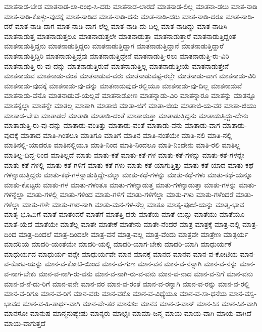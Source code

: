 {ಮಾತನಾಡ-ಬೇಡ
ಮಾತನಾಡ-ಲಾ-ರಂಭಿ-ಸಿ-ದರು
ಮಾತನಾಡ-ಲಾರದೆ
ಮಾತನಾಡ-ಲಿಲ್ಲ
ಮಾತನಾ-ಡಲು
ಮಾತ-ನಾಡಿ
ಮಾತ-ನಾಡಿ-ಕೊಳ್ಳು-ವುದಕ್ಕೆ
ಮಾತ-ನಾಡಿದ
ಮಾತ-ನಾಡಿ-ದನು
ಮಾತ-ನಾಡಿ-ದರು
ಮಾತ-ನಾಡಿ-ದರೂ
ಮಾತ-ನಾಡಿ-ದರೆ
ಮಾತ-ನಾಡಿ-ದಾಗ
ಮಾತ-ನಾಡಿ-ದಾಗ-ಲೆಲ್ಲ
ಮಾತ-ನಾಡಿ-ದು-ದಿಲ್ಲ
ಮಾತ-ನಾಡಿದ್ದು
ಮಾತ-ನಾಡಿಸಿ
ಮಾತನಾಡುತ್ತ
ಮಾತನಾಡುತ್ತಲೂ
ಮಾತನಾಡುತ್ತಲೇ
ಮಾತನಾಡುತ್ತಾ
ಮಾತನಾಡುತ್ತಾರೆ
ಮಾತನಾಡುತ್ತಿದ್ದಂತೆ
ಮಾತನಾಡುತ್ತಿದ್ದನು
ಮಾತನಾಡುತ್ತಿದ್ದರು
ಮಾತನಾಡುತ್ತಿದ್ದಾಗ
ಮಾತನಾಡುತ್ತಿದ್ದಾನೆ
ಮಾತನಾಡುತ್ತಿದ್ದಾರೆ
ಮಾತನಾಡುತ್ತಿದ್ದಿರಿ
ಮಾತನಾಡುತ್ತಿದ್ದೆವು
ಮಾತನಾಡುತ್ತಿದ್ದೇನೆ
ಮಾತನಾಡುತ್ತಿ-ರಲು
ಮಾತನಾಡುತ್ತಿ-ರು-ವಿರಿ
ಮಾತನಾಡುತ್ತಿ-ರು-ವು-ದನ್ನು
ಮಾತನಾಡುತ್ತಿರುವೆ
ಮಾತನಾಡುತ್ತಿಲ್ಲ
ಮಾತನಾಡುತ್ತೀಯೆ
ಮಾತನಾಡುತ್ತೇನೆ
ಮಾತನಾಡುವ
ಮಾತನಾಡು-ವಂತೆ
ಮಾತನಾಡುವ-ವರು
ಮಾತನಾಡುವಷ್ಟ-ರಲ್ಲೇ
ಮಾತನಾಡು-ವಾಗ
ಮಾತನಾಡು-ವಿರಿ
ಮಾತನಾಡು-ವುದಕ್ಕೆ
ಮಾತನಾಡು-ವು-ದನ್ನು
ಮಾತನಾಡುವುದ-ರಲ್ಲಿಯೂ
ಮಾತನಾಡು-ವು-ದಿಲ್ಲ
ಮಾತನಾಡುವೆ
ಮಾತನಾಡು-ವೆನೊ
ಮಾತನಾಡುವೆ-ಯಲ್ಲವೆ
ಮಾತನಾಡೋಣ
ಮಾತನ್ನಾಡು-ವಿರಿ
ಮಾತನ್ನಾರೂ
ಮಾತನ್ನು
ಮಾತನ್ನೂ
ಮಾತನ್ನೆಲ್ಲಾ
ಮಾತನ್ನೇ
ಮಾತಲ್ಲ
ಮಾತಾಗಿ
ಮಾತಾಜಿ
ಮಾತಾ-ಜಿಗೆ
ಮಾತಾ-ಜಿಯ
ಮಾತಾಜಿ-ಯ-ವರ
ಮಾತಾ-ಜಿಯು
ಮಾತಾಡ-ಬೇಕು
ಮಾತಾಡಲೆ
ಮಾತಾಡಿ
ಮಾತಾಡಿ-ದಂತೆ
ಮಾತಾಡುತ್ತಾ
ಮಾತಾಡುತ್ತಿದ್ದನು
ಮಾತಾಡುತ್ತಿದ್ದು-ದೇನು
ಮಾತಾಡುತ್ತಿ-ರು-ವು-ದನ್ನು
ಮಾತಾಡು-ವಂತಿತ್ತು
ಮಾತಾಡು-ವಂತೆ
ಮಾತಾಡು-ವನು
ಮಾತಾಡು-ವಾಗ
ಮಾತಾಡು-ವುದಕ್ಕೆ
ಮಾತಾದ
ಮಾತಿ-ಗಿಂತಲೂ
ಮಾತಿಗೂ
ಮಾತಿಗೆ
ಮಾತಿನ
ಮಾತಿ-ನಂತೆಯೇ
ಮಾತಿ-ನಲಿ
ಮಾತಿ-ನಲ್ಲಿ
ಮಾತಿನಲ್ಲಿ-ಯಾದರೂ
ಮಾತಿನಲ್ಲಿಯೂ
ಮಾತಿ-ನಿಂದ
ಮಾತಿ-ನಿಂದಲೂ
ಮಾತಿ-ನಿಂದೇನು
ಮಾತಿ-ರಲಿ
ಮಾತಿಲ್ಲ
ಮಾತಿಲ್ಲ-ದಿದ್ದ-ರಿಂದ
ಮಾತಿಲ್ಲದೆ
ಮಾತು
ಮಾತು-ಕತೆ
ಮಾತು-ಕತೆ-ಗಳ
ಮಾತು-ಕತೆ-ಗಳನ್ನು
ಮಾತು-ಕತೆ-ಗಳನ್ನೇ
ಮಾತು-ಕತೆ-ಗಳಲ್ಲಿ
ಮಾತು-ಕತೆ-ಗಳಿಗೆ
ಮಾತು-ಕತೆ-ಗಳು
ಮಾತು-ಕತೆ-ಯಾಗುತ್ತಿತ್ತು
ಮಾತು-ಕತೆ-ಯಾದ
ಮಾತು-ಕಥೆ-ಗಳನ್ನಾಡುತ್ತಿದ್ದರು
ಮಾತು-ಕಥೆ-ಗಳನ್ನಾಡುತ್ತಿದ್ದೇ-ವಲ್ಲಾ
ಮಾತು-ಕಥೆ-ಗಳನ್ನು
ಮಾತು-ಕಥೆ-ಗಳು
ಮಾತು-ಕಥೆ-ಯನ್ನೂ
ಮಾತು-ಕೊಟ್ಟರು
ಮಾತು-ಗಳ
ಮಾತು-ಗಳಂತೂ
ಮಾತು-ಗಳನ್ನಾಡುತ್ತ
ಮಾತು-ಗಳನ್ನಾಡುತ್ತಾ
ಮಾತು-ಗಳನ್ನು
ಮಾತು-ಗಳನ್ನೆಲ್ಲಾ
ಮಾತು-ಗಳಲ್ಲಿ
ಮಾತು-ಗಳಿಂದ
ಮಾತು-ಗಳಿಗೆ
ಮಾತು-ಗಳಿಗೆಲ್ಲಾ
ಮಾತು-ಗಳು
ಮಾತು-ಗಳೆಂದರೆ
ಮಾತು-ಗಳೆಲ್ಲಾ
ಮಾತು-ಗಳೇ
ಮಾತು-ಗಾರ-ನಾಗಿ
ಮಾತು-ಮನ-ಗಳ-ನೆಲ್ಲ
ಮಾತೂ
ಮಾತೃ-ಪೂಜೆ-ಯನ್ನು
ಮಾತೃ-ಭಾವ
ಮಾತೃ-ಭೂಮಿಗೆ
ಮಾತೆ
ಮಾತೆಂದರೆ
ಮಾತೆಗೆ
ಮಾತೆತ್ತಿ-ದರು
ಮಾತೆಯ
ಮಾತೆ-ಯನ್ನು
ಮಾತೆಯು
ಮಾತೆಯೂ
ಮಾತೆ-ಯೆದೆ
ಮಾತೆಯೇ
ಮಾತೆಲ್ಲ
ಮಾತೇ
ಮಾತೇಕೆ
ಮಾತೇನು
ಮಾತೇ-ನೆಂದರೆ
ಮಾತ್ರ
ಮಾತ್ರಕ್ಕೆ
ಮಾತ್ರ-ದಲ್ಲಿ
ಮಾತ್ರ-ದಿಂದ
ಮಾತ್ರ-ದಿಂದಲೆ
ಮಾತ್ರ-ದಿಂದಲೇ
ಮಾತ್ರ-ವನೆ
ಮಾತ್ರ-ವಲ್ಲ
ಮಾತ್ರ-ವೆಂದು
ಮಾತ್ರವೇ
ಮಾತ್ರೇಣ
ಮಾತ್ಸರ್ಯ
ಮಾದರಿಯ
ಮಾದರಿ-ಯಂತೆಯೇ
ಮಾದರಿ-ಯಲ್ಲಿ
ಮಾದರಿ-ಯಾಗ-ಬೇಕು
ಮಾದರಿ-ಯಾಗಿ
ಮಾಧುರ್ಯಕೆ
ಮಾಧುರ್ಯದ
ಮಾಧುರ್ಯ-ವನ್ನೇ
ಮಾಧುರ್ಯವೇ
ಮಾನ
ಮಾನಕ್ಕೆ
ಮಾನದ
ಮಾನವ
ಮಾನ-ವ-ಕೋಟಿಯ
ಮಾನ-ವ-ಕೋಟಿ-ಯನ್ನು
ಮಾನ-ವ-ಕೋಟಿ-ಯಿಂದ
ಮಾನ-ವ-ಗುಣ
ಮಾನ-ವನ
ಮಾನ-ವ-ನನ್ನಾಗಿ
ಮಾನ-ವ-ನನ್ನು
ಮಾನ-ವ-ನಾಗ-ಬೇಕು
ಮಾನ-ವ-ನಾಗಿ-ರು-ವನು
ಮಾನ-ವ-ನಾಗಿ-ರು-ವ-ವನು
ಮಾನ-ವ-ನಾದ
ಮಾನ-ವ-ನಿಗೆ
ಮಾನ-ವನು
ಮಾನ-ವ-ನೆ-ದು-ರಿಗೆ
ಮಾನ-ವನೇ
ಮಾನ-ವರ
ಮಾನ-ವ-ರಂತೆ
ಮಾನ-ವ-ರನ್ನಾಗಿ
ಮಾನ-ವ-ರನ್ನು
ಮಾನ-ವ-ರಲ್ಲಿ
ಮಾನ-ವ-ರಿಗೂ
ಮಾನ-ವ-ರಿಗೆ
ಮಾನ-ವರು
ಮಾನ-ವರೊ
ಮಾನ-ವ-ವಿಧ್ಯೆಯೂ
ಮಾನ-ವ-ಸಾ-ಧನೆಯ
ಮಾನ-ವಸ್ವ-ಭಾವದ
ಮಾನ-ವ-ಹಿ-ತಾರ್ಥ-ವಾಗಿ
ಮಾನ-ವೇ-ತರ
ಮಾನಶುಃ
ಮಾನಸ
ಮಾನ-ಸ-ವಾನ್
ಮಾನ-ಸಿಕ
ಮಾನ-ಸಿಕ-ವಾಗಿ
ಮಾನಸೋ
ಮಾನುಷ
ಮಾನ್ಮನುಷ್ಯೇಷು
ಮಾನ್ಯರು
ಮಾಭೈಃ
ಮಾಮಾ-ಜನ್ಮ
ಮಾಯ
ಮಾಯ-ವಾಗಿ
ಮಾಯ-ವಾಗಿದೆ
ಮಾಯ-ವಾಗುತ್ತದೆ
}
